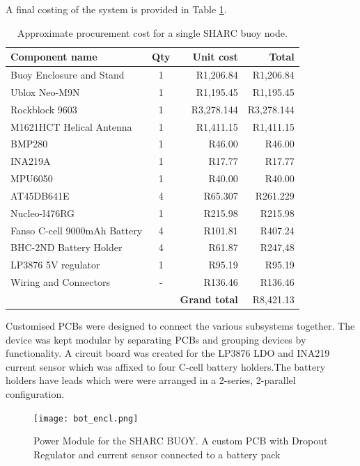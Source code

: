 A final costing of the system is provided in Table \ref{tab:total_cost}.
\begin{table}[H]
	\centering
	\caption{Approximate procurement cost for a single SHARC buoy node.}
	\setlength{\extrarowheight}{5pt}
	\begin{tabular}{l c r r}
		\hline \hline
		\textbf{Component name} & \textbf{Qty} & \textbf{Unit cost} & \textbf{Total}  \\
		\hline \hline
		Buoy Enclosure and Stand  & 1 & R1,206.84 & R1,206.84 \\
		Ublox Neo-M9N & 1 &  R1,195.45 &R1,195.45\\
		Rockblock 9603 & 1 & R3,278.144 & R3,278.144 \\
		M1621HCT Helical Antenna & 1 & R1,411.15 & R1,411.15 \\
		BMP280 & 1 & R46.00 & R46.00 \\
		INA219A & 1 & R17.77 & R17.77 \\
		MPU6050 & 1 & R40.00 & R40.00 \\
		AT45DB641E & 4 & R65.307 & R261.229 \\
		Nucleo-l476RG & 1 & R215.98 & R215.98 \\
		Fanso C-cell 9000mAh Battery & 4 & R101.81 & R407.24 \\
		BHC-2ND Battery Holder & 4 & R61.87 & R247,48 \\
		LP3876 5V regulator & 1 & R95.19 & R95.19 \\
		Wiring and Connectors & - & R136.46 & R136.46 \\
		\hline 
		\hline
		& & \textbf{ Grand total } & R8,421.13\\ 
		\hline \hline
	\end{tabular}
	\label{tab:total_cost}
\end{table}

Customised PCBs were designed to connect the various subsystems together. The device was kept modular by separating PCBs and grouping devices by functionality. A circuit board was created for the LP3876 LDO and INA219 current sensor which was affixed to four C-cell battery holders.The battery holders have leads which were were arranged in a 2-series, 2-parallel configuration.

\begin{figure}[H]
	\centering
	\texttt{[image: bot\_encl.png]}
	\caption{Power Module for the SHARC BUOY. A custom PCB with Dropout Regulator and current sensor connected to a battery pack}
	\label{fig:bot_elec}
\end{figure}

